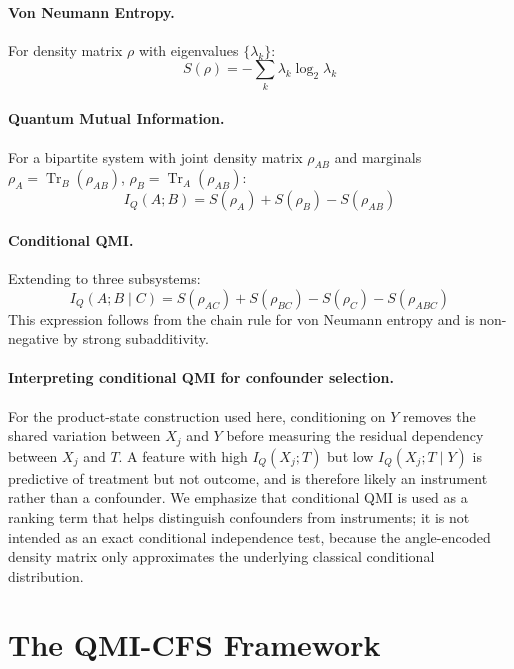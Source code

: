 \documentclass{svproc}
\newcommand{\QMI}{I_Q}
\newcommand{\vn}{S}
\begin{document}
\paragraph{Von Neumann Entropy.} For density matrix $\rho$ with eigenvalues $\{\lambda_k\}$:
\begin{equation}
    \vn(\rho) = -\sum_k \lambda_k \log_2 \lambda_k
\end{equation}

\paragraph{Quantum Mutual Information.} For a bipartite system with joint density matrix $\rho_{AB}$ and marginals $\rho_A = \operatorname{Tr}_B(\rho_{AB})$, $\rho_B = \operatorname{Tr}_A(\rho_{AB})$:
\begin{equation}
    \label{eq:qmi}
    \QMI(A;B) = \vn(\rho_A) + \vn(\rho_B) - \vn(\rho_{AB})
\end{equation}

\paragraph{Conditional QMI.} Extending to three subsystems:
\begin{equation}
    \label{eq:conditional_qmi}
    \QMI(A;B \mid C) = \vn(\rho_{AC}) + \vn(\rho_{BC}) - \vn(\rho_C) - \vn(\rho_{ABC})
\end{equation}
This expression follows from the chain rule for von Neumann entropy and is non-negative by strong subadditivity.

\paragraph{Interpreting conditional QMI for confounder selection.} For the product-state construction used here, conditioning on $Y$ removes the shared variation between $X_j$ and $Y$ before measuring the residual dependency between $X_j$ and $T$. A feature with high $\QMI(X_j; T)$ but low $\QMI(X_j; T \mid Y)$ is predictive of treatment but not outcome, and is therefore likely an instrument rather than a confounder. We emphasize that conditional QMI is used as a ranking term that helps distinguish confounders from instruments; it is not intended as an exact conditional independence test, because the angle-encoded density matrix only approximates the underlying classical conditional distribution.

\section{The QMI-CFS Framework}
\label{sec:method}
\end{document}
